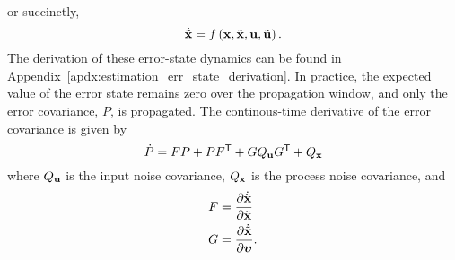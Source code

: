 or succinctly,
\begin{equation}
  \dot{\tilde{\boldsymbol{\mathrm{x}}}} = f\left(\boldsymbol{\mathrm{x}}, \tilde{\boldsymbol{\mathrm{x}}}, \boldsymbol{\mathrm{u}}, \tilde{\boldsymbol{\mathrm{u}}}\right).
\end{equation}
The derivation of these error-state dynamics can be found in
Appendix~\ref{apdx:estimation_err_state_derivation}. In practice, the expected
value of the error state remains zero over the propagation window, and only the
error covariance, $P$, is propagated.
The continous-time derivative of the error covariance is given by
\begin{equation}
  \dot{P} = FP + PF^{\mathsf{T}} + G Q_{\boldsymbol{\mathrm{u}}} G^{\mathsf{T}} + Q_{\boldsymbol{\mathrm{x}}}
\end{equation}
where $Q_{\boldsymbol{\mathrm{u}}}$ is the input noise covariance, $Q_{\boldsymbol{\mathrm{x}}}$ is the
process noise covariance, and
\begin{align}
  F &= \frac{ \partial \dot{\tilde{\boldsymbol{\mathrm{x}}}} }{ \partial \tilde{\boldsymbol{\mathrm{x}}} } \\
  G &= \frac{ \partial \dot{\tilde{\boldsymbol{\mathrm{x}}}} }{ \partial \boldsymbol{\mathrm{\upsilon}} } .
\end{align}
